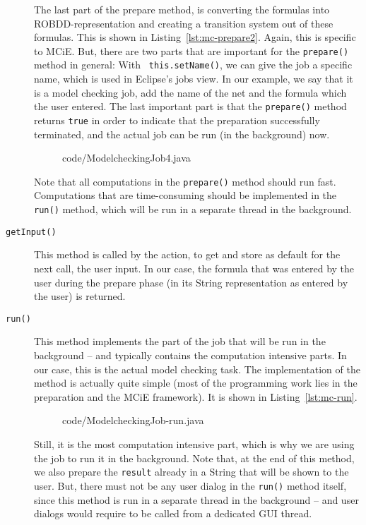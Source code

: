 \begin{description}
    The last part of the prepare method, is converting the formulas into
    ROBDD-representation and creating a transition system out of these formulas.
    This is shown in Listing~\ref{lst:mc-prepare2}.
    Again, this is specific to MCiE. But, there are two parts that are
    important for the {\tt prepare()} method in general: With {\tt 
    this.setName()}, we can give the job a specific name, which is used in
    Eclipse's jobs view. In our example, we say that it is a model checking job,
    add the name of the net and the formula which the user entered. The last
    important part is that the  {\tt prepare()} method returns {\tt true} in order to
    indicate that the preparation successfully terminated, and the actual
    job can be run (in the background) now.
\begin{figure}[htbp!]
%
{code/ModelcheckingJob4.java}
\end{figure}

    Note that all computations in the {\tt prepare()} method should run fast.
    Computations that are time-consuming should be implemented in the {\tt
    run()} method, which will be run in a separate thread in the background.

\item[{\tt getInput()}] This method is called by the action, to get and store
     as default for the next call, the user input. In our case, the formula
     that was entered by the user during the prepare phase (in its String
     representation as entered by the user) is returned.
     
\item[{\tt run()}] This method implements the part of the job that will be run
     in the background -- and typically contains the computation intensive
     parts. In our case, this is the actual model checking task.
     The implementation of the method is actually quite simple (most of the
     programming work lies in the preparation and the MCiE framework).
     It is shown in Listing~\ref{lst:mc-run}.
\begin{figure}[tbp!] %
%
{code/ModelcheckingJob-run.java}
\end{figure}
     Still, it is the most computation intensive part, which is why we are using
     the job to run it in the background. Note that, at the end of this method,
     we also prepare the {\tt result} already in a String that will be shown to the
     user. But, there must not be any user dialog in the {\tt run()} method
     itself, since this method is run in a separate thread in the background --
     and user dialogs would require to be called from a dedicated GUI thread. 


\end{description}
